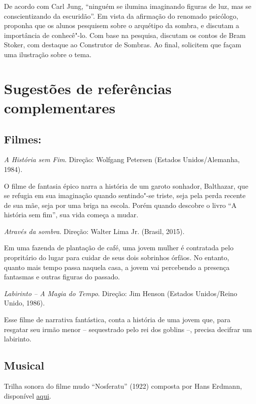 \documentclass[12pt]{extarticle}
\begin{document}
De acordo com Carl Jung, ``ninguém se ilumina imaginando figuras de
luz, mas se conscientizando da escuridão''. Em vista da afirmação do
renomado psicólogo, proponha que os alunos pesquisem sobre o arquétipo
da sombra, e discutam a importância de conhecê"-lo. Com base na
pesquisa, discutam os contos de Bram Stoker, com destaque ao
Construtor de Sombras. Ao final, solicitem que façam uma ilustração
sobre o tema.


\section{Sugestões de referências complementares}

\subsection{Filmes:}

\textit{A História sem Fim}. Direção: Wolfgang Petersen (Estados Unidos/Alemanha, 1984).

O filme de fantasia épico narra a história de um garoto sonhador, Balthazar, que se refugia 
em sua imaginação quando sentindo"-se triste, seja pela perda recente de sua mãe, seja por 
uma briga na escola. Porém quando descobre o livro ``A história sem fim'', sua vida começa 
a mudar. 

\textit{Através da sombra}. Direção: Walter Lima Jr. (Brasil, 2015).

Em uma fazenda de plantação de café, uma jovem mulher é contratada pelo propritário do lugar para 
cuidar de seus dois sobrinhos órfãos. No entanto, quanto mais tempo passa naquela casa, a jovem vai 
percebendo a presença fantasmas e outras figuras do passado.

\textit{Labirinto – A Magia do Tempo}. Direção: Jim Henson (Estados Unidos/Reino Unido, 1986).

Esse filme de narrativa fantástica, conta a história de uma jovem que, para resgatar seu irmão 
menor -- sequestrado pelo rei dos goblins --, precisa decifrar um labirinto.

\subsection{Musical}

Trilha sonora do filme mudo ``Nosferatu'' (1922) composta por Hans Erdmann, disponível \href{https://www.youtube.com/watch?v=NcH38cHjxoM&list=PL8719CBB5D13FFBCA&ab_channel=Billena}{aqui}.
\end{document}
